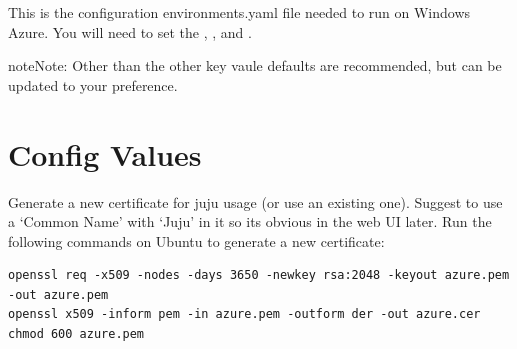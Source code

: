 \documentclass[letterpaper,10pt,english]{sphinxmanual}
\begin{document}
This is the configuration environments.yaml file needed to run on
Windows Azure. You will need to set the ,
, and .

\begin{notice}{note}{Note:}
Other than  the other key vaule defaults are
recommended, but can be updated to your preference.
\end{notice}


\section{Config Values}
\label{config-azure:config-values}
Generate a new certificate for juju usage (or use an existing one).
Suggest to use a `Common Name' with `Juju' in it so its obvious in the
web UI later. Run the following commands on Ubuntu to generate a new
certificate:

\begin{Verbatim}[commandchars=\\\{\}]
openssl req -x509 -nodes -days 3650 -newkey rsa:2048 -keyout azure.pem -out azure.pem
openssl x509 -inform pem -in azure.pem -outform der -out azure.cer
chmod 600 azure.pem
\end{Verbatim}
\end{document}
